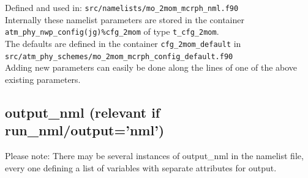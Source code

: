 Defined and used in: \verb+src/namelists/mo_2mom_mcrph_nml.f90+\\[-0.5em]

Internally these namelist parameters are stored in the container \texttt{atm\_phy\_nwp\_config(jg)\%cfg\_2mom} of type \texttt{t\_cfg\_2mom}.\\[-0.5em]

The defaults are defined in the container \texttt{cfg\_2mom\_default} in \verb+src/atm_phy_schemes/mo_2mom_mcrph_config_default.f90+\\[-0.5em]

Adding new parameters can easily be done along the lines of one of the above existing parameters.\\[-0.5em]


\subsection{output\_nml (relevant if run\_nml/output='nml')}\label{nml:output}

Please note: There may be several instances of
output\_nml in the namelist file, every one defining a list of variables with
separate attributes for output.

